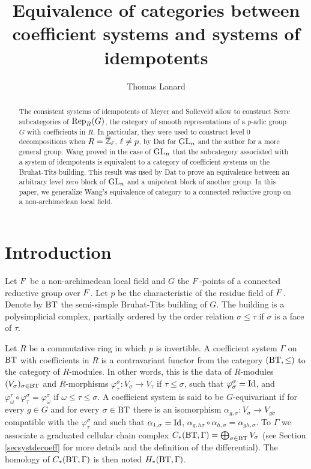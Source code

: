 \documentclass[a4paper,10pt]{amsart}
\title[Equivalence between coefficient systems and systems of idempotents]{Equivalence of categories between coefficient systems and systems of idempotents}
\author{Thomas Lanard}
\begin{document}
\begin{abstract}
The consistent systems of idempotents of Meyer and Solleveld allow to construct Serre subcategories of $\rep[R]{G}$, the category of smooth representations of a $p$-adic group $G$ with coefficients in $R$. In particular, they were used to construct level 0 decompositions when $R=\overline{\mathbb{Z}}_{\ell}$, $\ell \neq p$, by Dat for $\gl{n}$ and the author for a more general group. Wang proved in the case of $\gl{n}$ that the subcategory associated with a system of idempotents is equivalent to a category of coefficient systems on the Bruhat-Tits building. This result was used by Dat to prove an equivalence between an arbitrary level zero block of $\gl{n}$ and a unipotent block of another group. In this paper, we generalize Wang's equivalence of category to a connected reductive group on a non-archimedean local field.
\end{abstract}


\maketitle

\section*{Introduction}


Let $F$ be a non-archimedean local field and $G$ the $F$-points of a connected reductive group over $F$. Let $p$ be the characteristic of the residue field of $F$. Denote by $\bt$ the semi-simple Bruhat-Tits building of $G$. The building is a polysimplicial complex, partially ordered by the order relation $\sigma \leq \tau$ if $\sigma$ is a face of $\tau$.


Let $R$ be a commutative ring in which $p$ is invertible. A coefficient system $\Gamma$ on $\bt$ with coefficients in $R$ is a contravariant functor from the category $(\bt,\leq)$ to the category of $R$-modules. In other words, this is the data of $R$-modules $(V_{\sigma})_{\sigma \in \bt}$ and $R$-morphisms $\varphi_{\tau}^{\sigma}:V_{\sigma} \rightarrow V_{\tau}$ if $\tau \leq \sigma$, such that $\varphi_{\sigma}^{\sigma} = \operatorname{Id}$, and $\varphi_{\omega}^{\tau} \circ \varphi_{\tau}^{\sigma} = \varphi_{\omega}^{\sigma}$ if $\omega \leq \tau \leq \sigma$. A coefficient system is said to be $G$-equivariant if for every $g \in G$ and for every $\sigma \in \bt$ there is an isomorphism $\alpha_{g,\sigma}: V_{\sigma} \rightarrow V_{g\sigma}$ compatible with the $\varphi_{\tau}^{\sigma}$ and such that $\alpha_{1,\sigma}=\operatorname{Id}$, $\alpha_{g,h\sigma} \circ \alpha_{h,\sigma} = \alpha_{gh,\sigma}$. To $\Gamma$ we associate a graduated cellular chain complex $C_{*}(\bt,\Gamma)=\bigoplus_{\sigma \in \bt} V_\sigma$ (see Section \ref{secsystdecoeff} for more details and the definition of the differential). The homology of $C_{*}(\bt,\Gamma)$ is then noted $H_{*}(\bt,\Gamma)$.
\end{document}
